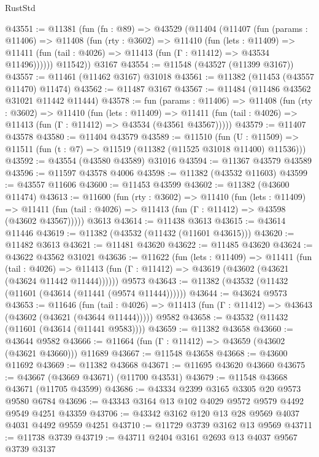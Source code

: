 \begin{lexlean}{RustStd}
\begin{coremodule}
@43551 := @11381
    (fun (fn : @89) =>
    @43529
      (@11404
        (@11407
          (fun (params : @11406) =>
          @11408
            (fun (rty : @3602) =>
            @11410
              (fun (lets : @11409) =>
              @11411 (fun (tail : @4026) => @11413 (fun (Γ : @11412) => @43534 @11496))))))
        @11542))
    @3167
@43554 := @11548 (@43527 (@11399 @3167))
@43557 := @11461 (@11462 @3167) @31018
@43561 := @11382 (@11453 (@43557 @11470) @11474)
@43562 := @11487 @3167
@43567 := @11484 (@11486 @43562 @31021 @11442 @11444)
@43578 := fun (params : @11406) =>
  @11408
    (fun (rty : @3602) =>
    @11410
      (fun (lets : @11409) =>
      @11411 (fun (tail : @4026) => @11413 (fun (Γ : @11412) => @43534 (@43561 @43567)))))
@43579 := @11407 @43578
@43580 := @11404 @43579
@43589 := @11510
    (fun (U : @11509) => @11511 (fun (t : @7) => @11519 (@11382 (@11525 @31018 @11400) @11536)))
@43592 := @43554 (@43580 @43589) @31016
@43594 := @11367 @43579 @43589
@43596 := @11597 @43578 @4006
@43598 := @11382 (@43532 @11603)
@43599 := @43557 @11606
@43600 := @11453 @43599
@43602 := @11382 (@43600 @11474)
@43613 := @11600
    (fun (rty : @3602) =>
    @11410
      (fun (lets : @11409) =>
      @11411 (fun (tail : @4026) => @11413 (fun (Γ : @11412) => @43598 (@43602 @43567)))))
    @3613
@43614 := @11438 @3613
@43615 := @43614 @11446
@43619 := @11382 (@43532 (@11432 (@11601 @43615)))
@43620 := @11482 @3613
@43621 := @11481 @43620
@43622 := @11485 @43620
@43624 := @43622 @43562 @31021
@43636 := @11622
    (fun (lets : @11409) =>
    @11411
      (fun (tail : @4026) =>
      @11413 (fun (Γ : @11412) => @43619 (@43602 (@43621 (@43624 @11442 @11444))))))
    @9573
@43643 := @11382 (@43532 (@11432 (@11601 (@43614 (@11441 (@9574 @11444))))))
@43644 := @43624 @9573
@43653 := @11646
    (fun (tail : @4026) => @11413 (fun (Γ : @11412) => @43643 (@43602 (@43621 (@43644 @11444)))))
    @9582
@43658 := @43532 (@11432 (@11601 (@43614 (@11441 @9583))))
@43659 := @11382 @43658
@43660 := @43644 @9582
@43666 := @11664 (fun (Γ : @11412) => @43659 (@43602 (@43621 @43660))) @11689
@43667 := @11548 @43658
@43668 := @43600 @11692
@43669 := @11382 @43668
@43671 := @11695 @43620 @43660
@43675 := @43667 (@43669 @43671) (@11700 @43531)
@43679 := @11548 @43668 @43671 (@11705 @43599)
@43686 := @43334 @2399 @3165 @3305 @20 @9573 @9580 @6784
@43696 := @43343 @3164 @13 @102 @4029 @9572 @9579 @4492 @9549 @4251 @43359
@43706 := @43342 @3162 @120 @13 @28 @9569 @4037 @4031 @4492 @9559 @4251
@43710 := @11729 @3739 @3162 @13 @9569
@43711 := @11738 @3739
@43719 := @43711 @2404 @3161 @2693 @13 @4037 @9567 @3739 @3137

\end{coremodule}
\end{lexlean}

